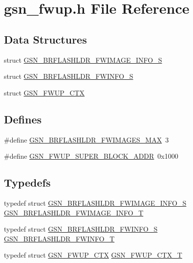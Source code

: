 \hypertarget{a00502}{
\section{gsn\_\-fwup.h File Reference}
\label{a00502}
}
\subsection*{Data Structures}
\begin{DoxyCompactItemize}
\item 
struct \hyperlink{a00027}{GSN\_\-BRFLASHLDR\_\-FWIMAGE\_\-INFO\_\-S}
\item 
struct \hyperlink{a00028}{GSN\_\-BRFLASHLDR\_\-FWINFO\_\-S}
\item 
struct \hyperlink{a00082}{GSN\_\-FWUP\_\-CTX}
\end{DoxyCompactItemize}
\subsection*{Defines}
\begin{DoxyCompactItemize}
\item 
\#define \hyperlink{a00502_a08715255e49de6b758fc8ff960d04ea9}{GSN\_\-BRFLASHLDR\_\-FWIMAGES\_\-MAX}~3
\item 
\#define \hyperlink{a00502_ac37eaa934c8636067a9233db69544c3a}{GSN\_\-FWUP\_\-SUPER\_\-BLOCK\_\-ADDR}~0x1000
\end{DoxyCompactItemize}
\subsection*{Typedefs}
\begin{DoxyCompactItemize}
\item 
typedef struct \hyperlink{a00027}{GSN\_\-BRFLASHLDR\_\-FWIMAGE\_\-INFO\_\-S} \hyperlink{a00502_a0c04110695a757c3845195aba8691580}{GSN\_\-BRFLASHLDR\_\-FWIMAGE\_\-INFO\_\-T}
\item 
typedef struct \hyperlink{a00028}{GSN\_\-BRFLASHLDR\_\-FWINFO\_\-S} \hyperlink{a00502_abcfb658142929ca326b2ff69b51d15ce}{GSN\_\-BRFLASHLDR\_\-FWINFO\_\-T}
\item 
typedef struct \hyperlink{a00082}{GSN\_\-FWUP\_\-CTX} \hyperlink{a00502_a93955cb93de548cf3b34832dc4c40f6e}{GSN\_\-FWUP\_\-CTX\_\-T}
\end{DoxyCompactItemize}
